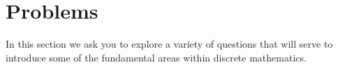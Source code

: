 \section{Problems}
In this section we ask you to explore a variety of questions that will
serve to introduce some of the fundamental areas within discrete mathematics. 
